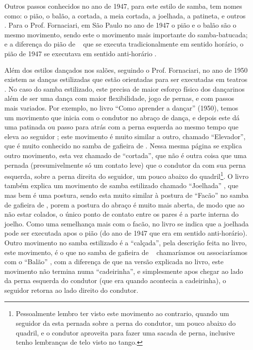 \begin{itemize}
Outros passos conhecidos no ano de 1947, para este estilo de samba, tem nomes como: 
o pião, o balão, a cortada, a meia cortada, a joelhada, a patineta, e outros \cite[pp. 66]{fornaciari1947aprender}.
Para o Prof. Fornaciari, em São Paulo no ano de 1947 o pião e o balão são o mesmo movimento, 
sendo este o movimento mais importante do samba-batucada;
e a diferença do pião de \AnoLivro~ que se executa tradicionalmente em sentido horário,
o pião de 1947 se executava em sentido anti-horário \cite[pp. 68,72]{fornaciari1947aprender} 
\cite[pp. 73]{fornaciari1950aprender}.

Além dos estilos dançados nos salões, seguindo o Prof. Fornaciari, 
no ano de 1950 existem as danças estilizadas que estão orientadas 
para ser executadas em teatros \cite[pp. 149]{fornaciari1950aprender}. 
No caso do samba estilizado, este precisa de maior esforço físico dos dançarinos 
além de ser uma dança com maior flexibilidade, jogo de pernas, e com passos mais variados.
Por exemplo, no livro ``Como aprender a dançar'' (1950), temos um movimento que inicia com o condutor no abraço de dança,
e depois este dá uma patinada ou passo para atrás com a perna esquerda 
ao mesmo tempo que eleva ao seguidor \cite[pp. 160-1961]{fornaciari1950aprender};
este movimento  é muito similar a outro, chamado ``Elevador'', que é muito conhecido no samba de gafieira de \AnoLivro.
Nessa mesma página se explica outro movimento, esta vez chamado de ``cortada'', 
que não é outra coisa que uma pernada (presumivelmente só um contato leve) que o condutor da com sua perna esquerda,
sobre a perna direita do seguidor, um pouco abaixo do quadril\footnote{
Pessoalmente lembro ter visto este movimento ao contrario, quando um seguidor da esta pernada 
sobre a perna do condutor, um pouco abaixo do quadril, e o condutor aproveita para fazer uma sacada de perna,
inclusive tenho lembranças de telo visto no tango.}.
O livro também explica um movimento de samba estilizado chamado ``Joelhada'' \cite[pp. 160-1961]{fornaciari1950aprender}, 
que mas bem é uma postura, sendo esta muito similar à postura de ``Facão'' no samba de gafieira de \AnoLivro,
porem a postura do abraço é muito mais aberta, de modo que ao não estar colados,
o único ponto de contato entre os pares é a parte interna do joelho. 
Como uma semelhança mais com o facão,
no livro se indica que a joelhada pode ser executada apos o pião (do ano de 1947 que era em sentido anti-horário).
Outro movimento no samba estilizado é a ``calçada'', pela descrição feita no livro,
este movimento, é o que no samba de gafieira de \AnoLivro~ chamaríamos ou associaríamos com o ``Balão'' \cite[pp. 162]{fornaciari1950aprender},
com a diferença de que na versão explicada no livro, este movimento não termina numa ``cadeirinha'',
e simplesmente apos chegar ao lado da perna esquerda do condutor (que era quando acontecia a cadeirinha), 
o seguidor retorna ao lado direito do condutor. 


\end{itemize}
